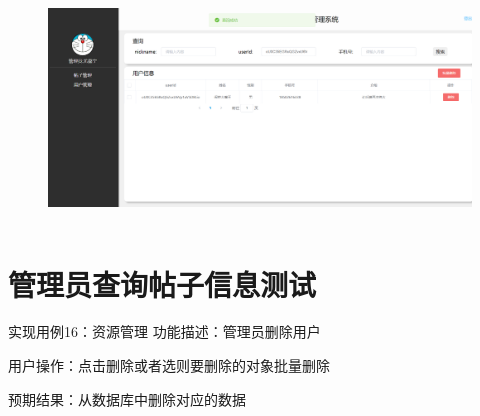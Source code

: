         \begin{figure}[htbp]
            \centering
            \begin{minipage}[t]{0.9\textwidth}
            \centering
            \includegraphics[width=12cm,height=6cm]{test/image/adm5.png} 
            \end{minipage}
            \end{figure}
           
\section{管理员查询帖子信息测试}
实现用例16：资源管理
功能描述：管理员删除用户
   
用户操作：点击删除或者选则要删除的对象批量删除

预期结果：从数据库中删除对应的数据

